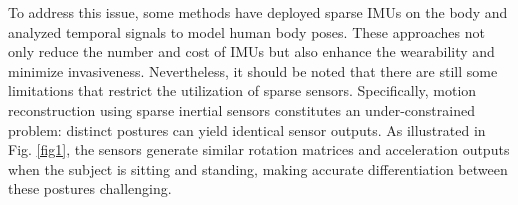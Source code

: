 \documentclass[letterpaper]{article} %
\begin{document}


To address this issue, some methods \cite{huang2018deep,yi2021transpose,jiang2022transformer,von2017sparse,yi2022physical} have deployed sparse IMUs on the body and analyzed temporal signals to model human body poses.
These approaches not only reduce the number and cost of IMUs but also enhance the wearability and minimize invasiveness.
Nevertheless, it should be noted that there are still some limitations that restrict the utilization of sparse sensors. 
% 
Specifically, motion reconstruction using sparse inertial sensors constitutes an under-constrained problem: distinct postures can yield identical sensor outputs. As illustrated in Fig. \ref{fig1}, the sensors generate similar rotation matrices and acceleration outputs when the subject is sitting and standing, making accurate differentiation between these postures challenging.
\end{document}
